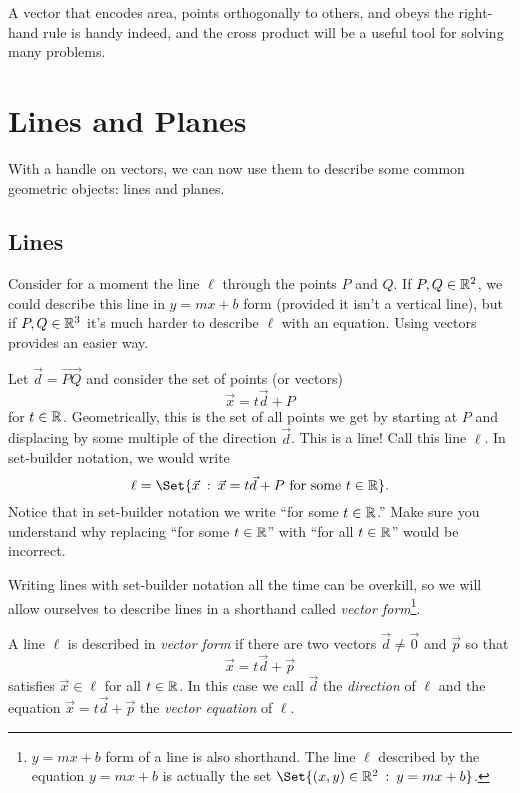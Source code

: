 A vector that encodes area, points orthogonally to others, and obeys the right-hand
rule is handy indeed, and the cross product will be a useful tool for solving
many problems.


\begin{exercises}
\end{exercises}


\section{Lines and Planes}

With a handle on vectors, we can now use them to describe some common geometric
objects: lines and planes.

\subsection{Lines}
Consider for a moment the line $\ell$ through the points $P$ and $Q$.  If $P,Q\in\mathbb{R}^2$, we
could describe this line in $y=mx+b$ form (provided it isn't a vertical line), but if
$P,Q\in\mathbb{R}^3$ it's much harder to describe $\ell$ with an equation.  Using vectors
provides an easier way.

Let $\vec d=\overrightarrow{PQ}$ and consider the set of points (or vectors)
\[
	\vec x=t\vec d+P
\]
for $t\in \mathbb{R}$.  Geometrically, this is the set of all points we get by starting at $P$ and
displacing by some multiple of the direction $\vec d$.  This is a line!
Call this line $\ell$.  In set-builder notation, we would write
\[
	\ell=\Set{\vec x\given \vec x=t\vec d+P\text{ for some }t\in \R}.
\]
Notice that in set-builder notation we write ``for some $t\in \mathbb{R}$.'' Make sure you
understand why replacing ``for some $t\in\mathbb{R}$'' with ``for
all $t\in \mathbb{R}$'' would be incorrect.  

Writing lines with set-builder notation all the time can be overkill, 
so we will allow ourselves to describe lines in a shorthand called \emph{vector form}\footnote{
	$y=mx+b$ form of a line is also shorthand.  The line $\ell$ described by the equation
	$y=mx+b$ is actually the set $\Set{(x,y)\in\R^2\given y=mx+b}$.
}.  

\begin{definition}
	A line $\ell$ is described in \emph{vector form} if
	there are two vectors $\vec d\neq \vec 0$ and $\vec p$ so that
	\[
		\vec x=t\vec d+\vec p
	\]
	satisfies $\vec x\in \ell$ for all $t\in \mathbb{R}$.  In this case we call $\vec d$ the
	\emph{direction} of $\ell$ and the equation $\vec x=t\vec d+\vec p$ the \emph{vector equation}
	of $\ell$.
\end{definition}

